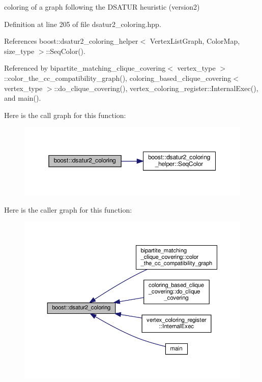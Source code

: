 coloring of a graph following the D\+S\+A\+T\+UR heuristic (version2) 



Definition at line 205 of file dsatur2\+\_\+coloring.\+hpp.



References boost\+::dsatur2\+\_\+coloring\+\_\+helper$<$ Vertex\+List\+Graph, Color\+Map, size\+\_\+type $>$\+::\+Seq\+Color().



Referenced by bipartite\+\_\+matching\+\_\+clique\+\_\+covering$<$ vertex\+\_\+type $>$\+::color\+\_\+the\+\_\+cc\+\_\+compatibility\+\_\+graph(), coloring\+\_\+based\+\_\+clique\+\_\+covering$<$ vertex\+\_\+type $>$\+::do\+\_\+clique\+\_\+covering(), vertex\+\_\+coloring\+\_\+register\+::\+Internal\+Exec(), and main().

Here is the call graph for this function\+:
\nopagebreak
\begin{figure}[H]
\begin{center}
\leavevmode
\includegraphics[width=350pt]{d4/da9/namespaceboost_a609873070b85df59333adc0769a99f6e_cgraph}
\end{center}
\end{figure}
Here is the caller graph for this function\+:
\nopagebreak
\begin{figure}[H]
\begin{center}
\leavevmode
\includegraphics[width=350pt]{d4/da9/namespaceboost_a609873070b85df59333adc0769a99f6e_icgraph}
\end{center}
\end{figure}
\mbox{\label{namespaceboost_af2fc5e009a055618e84aaacf8b9a0842}} 
